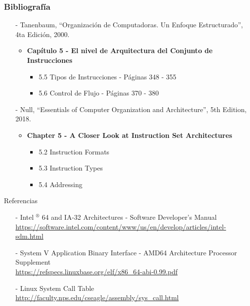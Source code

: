 \documentclass[aspectratio=169]{beamer}
\begin{document}
\begin{frame}[fragile]
    \frametitle{Bibliografía}
    \begin{itemize}
     \setlength\itemsep{0.5cm}
    \item[-] \small Tanenbaum, “Organización de Computadoras. Un Enfoque Estructurado”, 4ta Edición, 2000.\\
    \begin{itemize}
     \item \textbf{Capítulo 5 - El nivel de Arquitectura del Conjunto de Instrucciones}\\
     \begin{itemize}
      \item 5.5 Tipos de Instrucciones - Páginas 348 - 355
      \item 5.6 Control de Flujo - Páginas 370 - 380
     \end{itemize}
    \end{itemize}
    \item[-] \small Null, “Essentials of Computer Organization and Architecture”, 5th Edition, 2018.\\
    \begin{itemize}
    \item \textbf{Chapter 5 - A Closer Look at Instruction Set Architectures}
     \begin{itemize}
        \item 5.2 Instruction Formats 
        \item 5.3 Instruction Types
        \item 5.4 Addressing
     \end{itemize}
    \end{itemize}
    \end{itemize}
     \textcolor{naranjauca}{Referencias}
     \begin{itemize}
    \item[-] \small Intel $^{\circledR}$ 64 and IA-32 Architectures - Software Developer’s Manual\\
    { \scriptsize \url{https://software.intel.com/content/www/us/en/develop/articles/intel-sdm.html} }\\
    \item[-] \small System V Application Binary Interface - AMD64 Architecture Processor Supplement\\
    { \scriptsize \url{https://refspecs.linuxbase.org/elf/x86_64-abi-0.99.pdf} }\\
    \item[-] \small Linux System Call Table\\
    { \scriptsize \url{http://faculty.nps.edu/cseagle/assembly/sys_call.html} }\\
    \end{itemize}
\end{frame}
\end{document}
